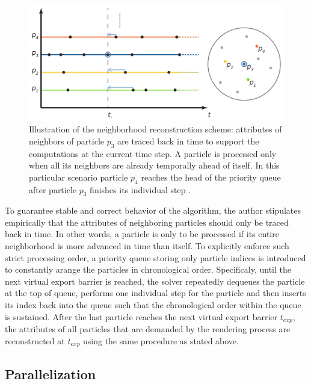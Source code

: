 \documentclass[
	11pt, 
	DIV10,
	ngerman,
	a4paper, 
	oneside, 
	headings=normal, 
	captions=tableheading,
	final, 
	numbers=noenddot
]{scrartcl}
\begin{document}
\begin{figure}[tb]
	\centering
	\includegraphics[scale=0.25]{images/5}
	\caption{\label{fig4} Illustration of the neighborhood reconstruction scheme: attributes of neighbors of particle $p_{3}$ are traced back in time to support the computations at the current time step. A particle is processed only when all its neighbors are already temporally ahead of itself. In this particular scenario particle $ p_{4} $ reaches the head of the priority queue after particle $p_{3}$ finishes its individual step \cite{reinhardt2017fully}.}
\end{figure}

To guarantee stable and correct behavior of the algorithm, the author stipulates empirically that the attributes of neighboring particles should only be traced back in time. In other words, a particle is only to be processed if its entire neighborhood is more advanced in time than itself. To explicitly enforce such strict processing order, a priority queue storing only particle indices is introduced to constantly arange the particles in chronological order. Specificaly, until the next virtual export barrier is reached, the solver repeatedly dequeues the particle at the top of queue, performs one individual step for the particle and then inserts its index back into the queue such that the chronological order within the queue is sustained. After the last particle reaches the next virtual export barrier $t_{exp}$, the attributes of all particles that are demanded by the rendering process are reconstructed at $t_{exp}$ using the same procedure as stated above.

\subsection{Parallelization}
\end{document}

